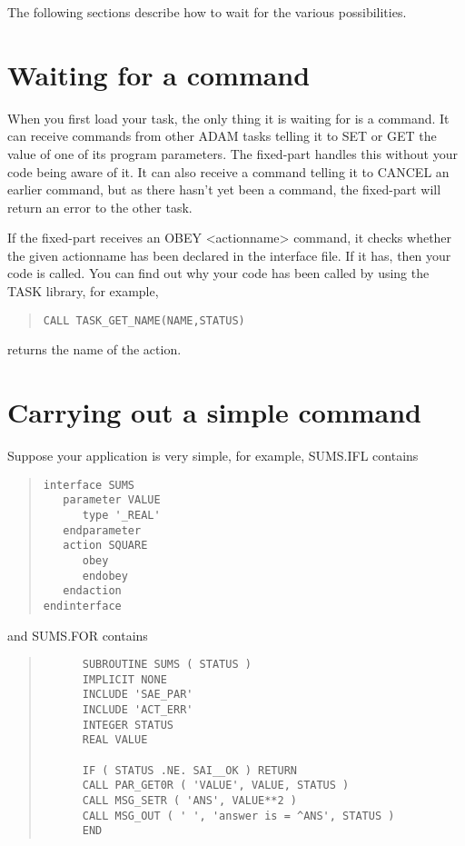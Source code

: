 \documentclass[twoside,11pt]{article}
\newcommand{\xlabel}[1]{}
\renewcommand{\_}{\texttt{\symbol{95}}}
\begin{document}
The following sections describe how to wait for the various 
possibilities.

\section{Waiting for a command\xlabel{waiting_for_a_command}}

When you first load your task, the only thing it is waiting for is a 
command. It can receive commands from other ADAM tasks telling it to SET 
or GET the value of one of its program parameters. The fixed-part 
handles this without your code being aware of it. It can also receive a 
command telling it to CANCEL an earlier command, but as there hasn't yet 
been a command, the fixed-part will return an error to the other task.

If the fixed-part receives an OBEY <action\_name> command, it checks 
whether the given action\_name has been declared in the interface file. 
If it has, then your code is called. You can find out why your code has 
been called by using the TASK library, for example, 
\small \begin{quote} \begin{verbatim}
CALL TASK_GET_NAME(NAME,STATUS)
\end{verbatim} \end{quote} \normalsize
returns the name of the action.

\section{Carrying out a simple command\xlabel{carrying_out_a_simple_command}}

Suppose your application is very simple, for example, SUMS.IFL contains 

\small \begin{quote} \begin{verbatim}
interface SUMS
   parameter VALUE
      type '_REAL'
   endparameter
   action SQUARE
      obey
      endobey
   endaction
endinterface
\end{verbatim} \end{quote} \normalsize

and SUMS.FOR contains

\small \begin{quote} \begin{verbatim}
      SUBROUTINE SUMS ( STATUS )
      IMPLICIT NONE
      INCLUDE 'SAE_PAR'
      INCLUDE 'ACT_ERR'
      INTEGER STATUS
      REAL VALUE

      IF ( STATUS .NE. SAI__OK ) RETURN
      CALL PAR_GET0R ( 'VALUE', VALUE, STATUS )
      CALL MSG_SETR ( 'ANS', VALUE**2 )
      CALL MSG_OUT ( ' ', 'answer is = ^ANS', STATUS )
      END
\end{verbatim} \end{quote} \normalsize
\end{document}
